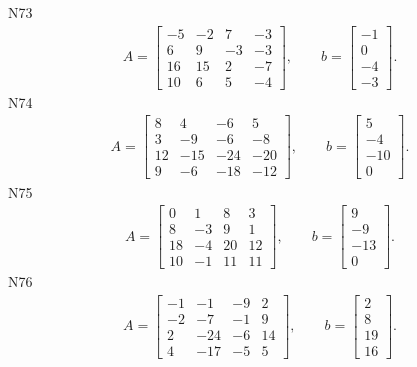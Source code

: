 \documentclass[11pt]{report}
\begin{document}
N73
\begin{align*}
 A = \left[\begin{matrix}-5 & -2 & 7 & -3\\6 & 9 & -3 & -3\\16 & 15 & 2 & -7\\10 & 6 & 5 & -4\end{matrix}\right],
\qquad b = \left[\begin{matrix}-1\\0\\-4\\-3\end{matrix}\right]. 
 \end{align*}
N74
\begin{align*}
 A = \left[\begin{matrix}8 & 4 & -6 & 5\\3 & -9 & -6 & -8\\12 & -15 & -24 & -20\\9 & -6 & -18 & -12\end{matrix}\right],
\qquad b = \left[\begin{matrix}5\\-4\\-10\\0\end{matrix}\right]. 
 \end{align*}
N75
\begin{align*}
 A = \left[\begin{matrix}0 & 1 & 8 & 3\\8 & -3 & 9 & 1\\18 & -4 & 20 & 12\\10 & -1 & 11 & 11\end{matrix}\right],
\qquad b = \left[\begin{matrix}9\\-9\\-13\\0\end{matrix}\right]. 
 \end{align*}
N76
\begin{align*}
 A = \left[\begin{matrix}-1 & -1 & -9 & 2\\-2 & -7 & -1 & 9\\2 & -24 & -6 & 14\\4 & -17 & -5 & 5\end{matrix}\right],
\qquad b = \left[\begin{matrix}2\\8\\19\\16\end{matrix}\right]. 
 \end{align*}
\end{document}
